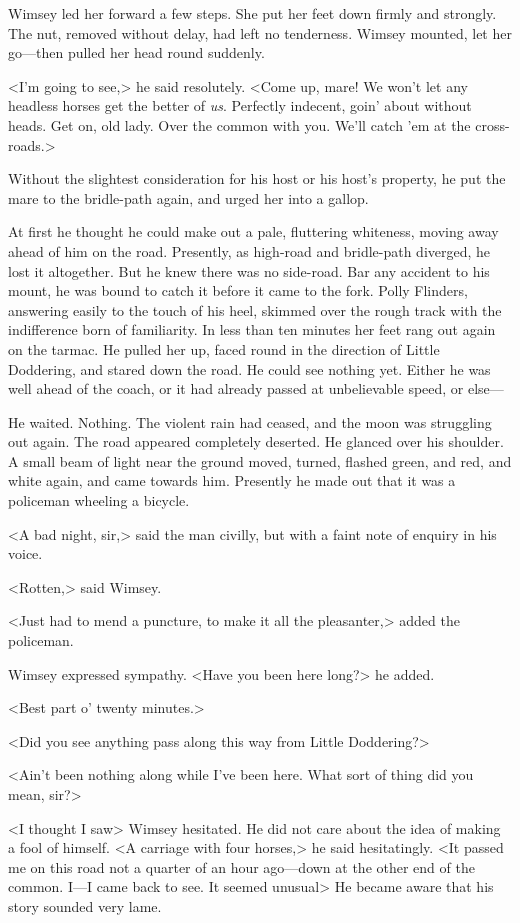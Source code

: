 Wimsey led her forward a few steps. She put her feet down firmly and strongly. The nut, removed without delay, had left no tenderness. Wimsey mounted, let her go—then pulled her head round suddenly.

<I'm going to see,> he said resolutely. <Come up, mare! We won't let any headless horses get the better of \textit{us}. Perfectly indecent, goin' about without heads. Get on, old lady. Over the common with you. We'll catch 'em at the cross-roads.>

Without the slightest consideration for his host or his host's property, he put the mare to the bridle-path again, and urged her into a gallop.

At first he thought he could make out a pale, fluttering whiteness, moving away ahead of him on the road. Presently, as high-road and bridle-path diverged, he lost it altogether. But he knew there was no side-road. Bar any accident to his mount, he was bound to catch it before it came to the fork. Polly Flinders, answering easily to the touch of his heel, skimmed over the rough track with the indifference born of familiarity. In less than ten minutes her feet rang out again on the tarmac. He pulled her up, faced round in the direction of Little Doddering, and stared down the road. He could see nothing yet. Either he was well ahead of the coach, or it had already passed at unbelievable speed, or else—

He waited. Nothing. The violent rain had ceased, and the moon was struggling out again. The road appeared completely deserted. He glanced over his shoulder. A small beam of light near the ground moved, turned, flashed green, and red, and white again, and came towards him. Presently he made out that it was a policeman wheeling a bicycle.

<A bad night, sir,> said the man civilly, but with a faint note of enquiry in his voice.

<Rotten,> said Wimsey.

<Just had to mend a puncture, to make it all the pleasanter,> added the policeman.

Wimsey expressed sympathy. <Have you been here long?> he added.

<Best part o' twenty minutes.>

<Did you see anything pass along this way from Little Doddering?>

<Ain't been nothing along while I've been here. What sort of thing did you mean, sir?>

<I thought I saw\longdash> Wimsey hesitated. He did not care about the idea of making a fool of himself. <A carriage with four horses,> he said hesitatingly. <It passed me on this road not a quarter of an hour ago—down at the other end of the common. I—I came back to see. It seemed unusual\longdash> He became aware that his story sounded very lame.

